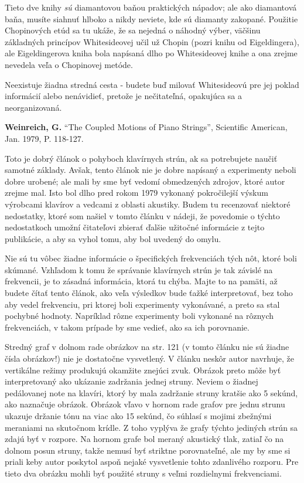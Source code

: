 Tieto dve knihy \textit{sú} diamantovou baňou praktických nápadov; ale ako diamantová baňa, musíte siahnuť hlboko a nikdy neviete, kde sú diamanty zakopané. Použitie Chopinových etúd sa tu ukáže, že sa nejedná o náhodný výber, väčšinu základných princípov Whitesideovej učil už Chopin (pozri knihu od Eigeldingera), ale Eigeldingerova kniha bola napísaná dlho po Whitesideovej knihe a ona zrejme nevedela veľa o Chopinovej metóde. 

Neexistuje žiadna stredná cesta - budete buď milovať Whitesideovú pre jej poklad informácií alebo nenávidieť, pretože je nečitateľná, opakujúca sa a neorganizovaná.

\textbf{Weinreich, G.} “The Coupled Motions of Piano Strings”, Scientific American, Jan. 1979, P. 118-127. 

Toto je dobrý článok o pohyboch klavírnych strún, ak sa potrebujete naučiť samotné základy. Avšak, tento článok nie je dobre napísaný a experimenty neboli dobre urobené; ale mali by sme byť vedomí obmedzených zdrojov, ktoré autor zrejme mal. Isto bol dlho pred rokom 1979 vykonaný pokročilejší výskum výrobcami klavírov a vedcami z oblasti akustiky. Budem tu recenzovať niektoré nedostatky, ktoré som našiel v tomto článku v nádeji, že povedomie o týchto nedostatkoch umožní čitateľovi zbierať ďalšie užitočné informácie z tejto publikácie, a aby sa  vyhol tomu, aby bol uvedený do omylu. 

Nie sú tu vôbec žiadne informácie o špecifických frekvenciách tých nôt, ktoré boli skúmané. Vzhľadom k tomu že správanie klavírnych strún je tak závislé na frekvencii, je to zásadná informácia, ktorá tu chýba. Majte to na pamäti, až budete čítať tento článok, ako veľa výsledkov bude ťažké interpretovať, bez toho aby vedel frekvenciu, pri ktorej boli experimenty vykonávané, a preto sa stal pochybné hodnoty. Napríklad rôzne experimenty boli vykonané na rôznych frekvenciách, v takom prípade by sme vedieť, ako sa ich porovnanie. 

Stredný graf v dolnom rade obrázkov na str. 121 (v tomto článku nie sú žiadne čísla obrázkov!) nie je dostatočne vysvetlený. V článku neskôr autor navrhuje, že vertikálne režimy produkujú okamžite znejúci zvuk. Obrázok preto môže byť interpretovaný ako ukázanie zadržania jednej struny. Neviem o žiadnej pedálovanej note na klavíri, ktorý by mala zadržanie struny kratšie ako 5 sekúnd, ako naznačuje obrázok. Obrázok vľavo v hornom rade grafov pre jednu strunu ukazuje držanie tónu na viac ako 15 sekúnd, čo súhlasí s mojimi zbežnými meraniami na skutočnom krídle. Z toho vyplýva že grafy týchto jediných strún sa zdajú byť v rozpore. Na hornom grafe bol meraný akustický tlak, zatiaľ čo na dolnom posun struny, takže nemusí byť striktne porovnateľné, ale my by sme si priali keby autor poskytol aspoň nejaké vysvetlenie tohto zdanlivého rozporu. Pre tieto dva obrázku mohli byť použité struny s veľmi rozdielnymi frekvenciami. 

